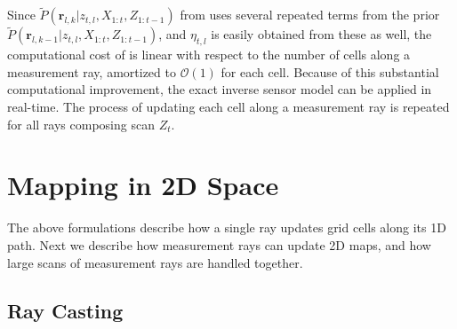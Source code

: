 
Since $\tilde P(\mathbf{r}_{l,k}|z_{t,l},X_{1:t},Z_{1:t-1})$ from  uses several repeated terms from the prior $\tilde P(\mathbf{r}_{l,k-1}|z_{t,l},X_{1:t},Z_{1:t-1})$, and $\eta_{t,l}$ is easily obtained from these as well, the computational cost of  is linear with respect to the number of cells along a measurement ray, amortized to $\mathcal{O}(1)$ for each cell. Because of this substantial computational improvement, the exact inverse sensor model can be applied in real-time. The process of updating each cell along a measurement ray is repeated for all rays composing scan $Z_t$.



\section{Mapping in 2D Space}

The above formulations describe how a single ray updates grid cells along its 1D path. Next we describe how measurement rays can update 2D maps, and how large scans of measurement rays are handled together.

\subsection{Ray Casting}
\label{sec:RayCasting}

